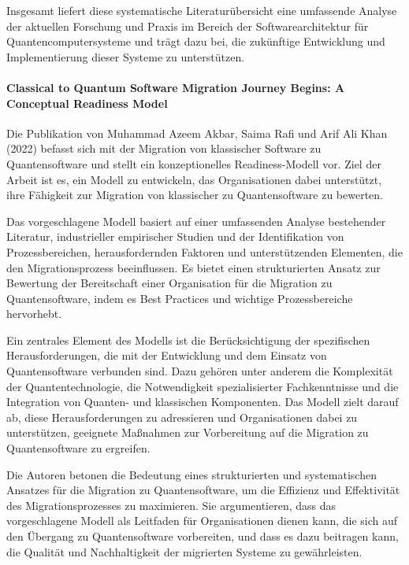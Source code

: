 Insgesamt liefert diese systematische Literaturübersicht eine umfassende Analyse der aktuellen Forschung und 
Praxis im Bereich der Softwarearchitektur für Quantencomputersysteme und trägt dazu bei, die zukünftige Entwicklung 
und Implementierung dieser Systeme zu unterstützen.

\paragraph{Classical to Quantum Software Migration Journey Begins: A Conceptual Readiness Model}

Die Publikation von Muhammad Azeem Akbar, Saima Rafi und Arif Ali Khan (2022) befasst sich mit der Migration von klassischer 
Software zu Quantensoftware und stellt ein konzeptionelles Readiness-Modell vor. Ziel der Arbeit ist es, ein Modell 
zu entwickeln, das Organisationen dabei unterstützt, ihre Fähigkeit zur Migration von klassischer zu Quantensoftware zu bewerten.

Das vorgeschlagene Modell basiert auf einer umfassenden Analyse bestehender Literatur, industrieller empirischer 
Studien und der Identifikation von Prozessbereichen, herausfordernden Faktoren und unterstützenden Elementen, die 
den Migrationsprozess beeinflussen. Es bietet einen strukturierten Ansatz zur Bewertung der Bereitschaft einer 
Organisation für die Migration zu Quantensoftware, indem es Best Practices und wichtige Prozessbereiche hervorhebt.

Ein zentrales Element des Modells ist die Berücksichtigung der spezifischen Herausforderungen, die mit der 
Entwicklung und dem Einsatz von Quantensoftware verbunden sind. Dazu gehören unter anderem die Komplexität der 
Quantentechnologie, die Notwendigkeit spezialisierter Fachkenntnisse und die Integration von Quanten- und 
klassischen Komponenten. Das Modell zielt darauf ab, diese Herausforderungen zu adressieren und Organisationen 
dabei zu unterstützen, geeignete Maßnahmen zur Vorbereitung auf die Migration zu Quantensoftware zu ergreifen.

Die Autoren betonen die Bedeutung eines strukturierten und systematischen Ansatzes für die Migration zu 
Quantensoftware, um die Effizienz und Effektivität des Migrationsprozesses zu maximieren. Sie argumentieren, dass 
das vorgeschlagene Modell als Leitfaden für Organisationen dienen kann, die sich auf den Übergang zu 
Quantensoftware vorbereiten, und dass es dazu beitragen kann, die Qualität und Nachhaltigkeit der 
migrierten Systeme zu gewährleisten.

